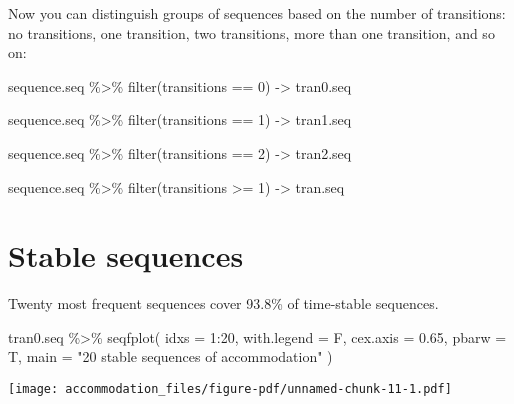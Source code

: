\documentclass[
  letterpaper,
  DIV=11,
  numbers=noendperiod]{scrreprt}
\newenvironment{Shaded}{\begin{snugshade}}{\end{snugshade}}
\newcommand{\AttributeTok}[1]{\textcolor[rgb]{0.40,0.45,0.13}{#1}}
\newcommand{\DecValTok}[1]{\textcolor[rgb]{0.68,0.00,0.00}{#1}}
\newcommand{\FloatTok}[1]{\textcolor[rgb]{0.68,0.00,0.00}{#1}}
\newcommand{\FunctionTok}[1]{\textcolor[rgb]{0.28,0.35,0.67}{#1}}
\newcommand{\NormalTok}[1]{\textcolor[rgb]{0.00,0.23,0.31}{#1}}
\newcommand{\OtherTok}[1]{\textcolor[rgb]{0.00,0.23,0.31}{#1}}
\newcommand{\SpecialCharTok}[1]{\textcolor[rgb]{0.37,0.37,0.37}{#1}}
\newcommand{\StringTok}[1]{\textcolor[rgb]{0.13,0.47,0.30}{#1}}
\begin{document}
Now you can distinguish groups of sequences based on the number of
transitions: no transitions, one transition, two transitions, more than
one transition, and so on:

\begin{Shaded}
\begin{Highlighting}[]
\NormalTok{sequence.seq }\SpecialCharTok{\%\textgreater{}\%} 
  \FunctionTok{filter}\NormalTok{(transitions }\SpecialCharTok{==} \DecValTok{0}\NormalTok{) }\OtherTok{{-}\textgreater{}}\NormalTok{ tran0.seq}

\NormalTok{sequence.seq }\SpecialCharTok{\%\textgreater{}\%} 
  \FunctionTok{filter}\NormalTok{(transitions }\SpecialCharTok{==} \DecValTok{1}\NormalTok{) }\OtherTok{{-}\textgreater{}}\NormalTok{ tran1.seq}

\NormalTok{sequence.seq }\SpecialCharTok{\%\textgreater{}\%} 
  \FunctionTok{filter}\NormalTok{(transitions }\SpecialCharTok{==} \DecValTok{2}\NormalTok{) }\OtherTok{{-}\textgreater{}}\NormalTok{ tran2.seq}

\NormalTok{sequence.seq }\SpecialCharTok{\%\textgreater{}\%} 
  \FunctionTok{filter}\NormalTok{(transitions }\SpecialCharTok{\textgreater{}=} \DecValTok{1}\NormalTok{) }\OtherTok{{-}\textgreater{}}\NormalTok{ tran.seq}
\end{Highlighting}
\end{Shaded}

\section{Stable sequences}\label{stable-sequences}

Twenty most frequent sequences cover 93.8\% of time-stable sequences.

\begin{Shaded}
\begin{Highlighting}[]
\NormalTok{tran0.seq }\SpecialCharTok{\%\textgreater{}\%} 
  \FunctionTok{seqfplot}\NormalTok{(}
    \AttributeTok{idxs =} \DecValTok{1}\SpecialCharTok{:}\DecValTok{20}\NormalTok{,}
    \AttributeTok{with.legend =}\NormalTok{ F,}
    \AttributeTok{cex.axis =} \FloatTok{0.65}\NormalTok{,}
    \AttributeTok{pbarw =}\NormalTok{ T,}
    \AttributeTok{main =} \StringTok{"20 stable sequences of accommodation"}
\NormalTok{  )}
\end{Highlighting}
\end{Shaded}

\texttt{[image: accommodation\_files/figure-pdf/unnamed-chunk-11-1.pdf]}
\end{document}
